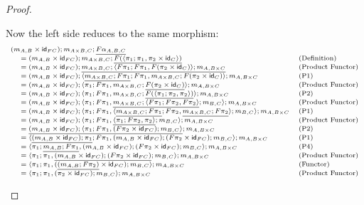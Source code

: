\begin{proof}
\begin{itemize}
    Now the left side reduces to the same morphism:
    \[
    \scriptsize
    \begin{array}{lll}
      (m_{A,B} \times \mathsf{id}_{FC});m_{A \times B,C};\underline{F\alpha_{A,B,C}} \\
    \,\,\,\,\,\,\,\,= (m_{A,B} \times \mathsf{id}_{FC});m_{A \times B,C};\underline{F(\langle \pi_1;\pi_1, \pi_2 \times \mathsf{id}_C \rangle)} & \text{(Definition)}\\
   \,\,\,\,\,\,\,\,= (m_{A,B} \times \mathsf{id}_{FC});\underline{m_{A \times B,C};\langle F\pi_1;F\pi_1, F(\pi_2 \times \mathsf{id}_C) \rangle;m_{A,B \times C}} & \text{(Product Functor)}\\
   \,\,\,\,\,\,\,\,= (m_{A,B} \times \mathsf{id}_{FC});\langle \underline{m_{A \times B,C};F\pi_1};F\pi_1, m_{A \times B,C};F(\pi_2 \times \mathsf{id}_C) \rangle;m_{A,B \times C} & \text{(P1)}\\
   \,\,\,\,\,\,\,\,= (m_{A,B} \times \mathsf{id}_{FC});\langle \pi_1;F\pi_1, m_{A \times B,C};\underline{F(\pi_2 \times \mathsf{id}_C)} \rangle;m_{A,B \times C} & \text{(Product Functor)}\\
   \,\,\,\,\,\,\,\,= (m_{A,B} \times \mathsf{id}_{FC});\langle \pi_1;F\pi_1, m_{A \times B,C};\underline{F(\langle \pi_1;\pi_2, \pi_2 \rangle)} \rangle;m_{A,B \times C} & \text{(P2)}\\
   \,\,\,\,\,\,\,\,= (m_{A,B} \times \mathsf{id}_{FC});\langle \pi_1;F\pi_1, \underline{m_{A \times B,C};\langle F\pi_1;F\pi_2, F\pi_2 \rangle};m_{B,C} \rangle;m_{A,B \times C} & \text{(Product Functor)}\\
   \,\,\,\,\,\,\,\,= (m_{A,B} \times \mathsf{id}_{FC});\langle \pi_1;F\pi_1, \langle \underline{m_{A \times B,C};F\pi_1};F\pi_2, \underline{m_{A \times B,C};F\pi_2} \rangle;m_{B,C} \rangle;m_{A,B \times C} & \text{(P1)}\\
   \,\,\,\,\,\,\,\,= (m_{A,B} \times \mathsf{id}_{FC});\langle \pi_1;F\pi_1, \underline{\langle \pi_1;F\pi_2, \pi_2 \rangle};m_{B,C} \rangle;m_{A,B \times C} & \text{(Product Functor)}\\
   \,\,\,\,\,\,\,\,= \underline{(m_{A,B} \times \mathsf{id}_{FC});\langle \pi_1;F\pi_1, (F\pi_2 \times \mathsf{id}_{FC});m_{B,C} \rangle};m_{A,B \times C} & \text{(P2)}\\
   \,\,\,\,\,\,\,\,= \langle \underline{(m_{A,B} \times \mathsf{id}_{FC});\pi_1};F\pi_1, (m_{A,B} \times \mathsf{id}_{FC});(F\pi_2 \times \mathsf{id}_{FC});m_{B,C} \rangle;m_{A,B \times C} & \text{(P1)}\\
   \,\,\,\,\,\,\,\,= \langle \pi_1;\underline{m_{A,B};F\pi_1}, (m_{A,B} \times \mathsf{id}_{FC});(F\pi_2 \times \mathsf{id}_{FC});m_{B,C} \rangle;m_{A,B \times C} & \text{(P4)}\\
   \,\,\,\,\,\,\,\,= \langle \pi_1;\pi_1, \underline{(m_{A,B} \times \mathsf{id}_{FC});(F\pi_2 \times \mathsf{id}_{FC})};m_{B,C} \rangle;m_{A,B \times C} & \text{(Product Functor)}\\
   \,\,\,\,\,\,\,\,= \langle \pi_1;\pi_1, (\underline{(m_{A,B};F\pi_2)} \times \mathsf{id}_{FC});m_{B,C} \rangle;m_{A,B \times C} & \text{(Functor)}\\
   \,\,\,\,\,\,\,\,= \langle \pi_1;\pi_1, (\pi_2 \times \mathsf{id}_{FC});m_{B,C} \rangle;m_{A,B \times C} & \text{(Product Functor)}\\
    \end{array}
    \]


\end{itemize}
\end{proof}
